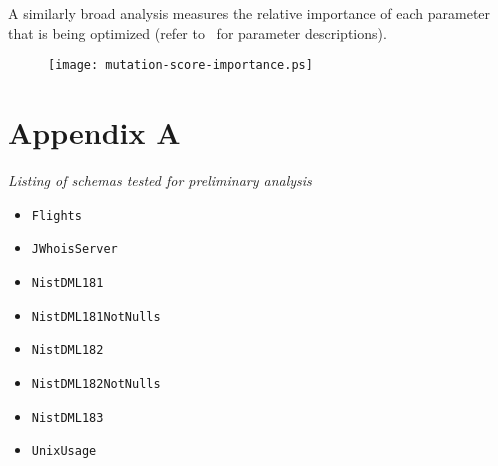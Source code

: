 \documentclass[a4paper,twocolumn]{article}
\begin{document}
A similarly broad analysis measures the relative importance of each parameter that is being optimized (refer to~ for parameter descriptions).

\begin{figure}[t]
\texttt{[image: mutation-score-importance.ps]}
\end{figure}




\pagebreak

\section*{Appendix A} \label{appA}
\textit{Listing of schemas tested for preliminary analysis}
\begin{itemize}
\item \texttt{Flights}
\item \texttt{JWhoisServer}
\item \texttt{NistDML181}
\item \texttt{NistDML181NotNulls}
\item \texttt{NistDML182}
\item \texttt{NistDML182NotNulls}
\item \texttt{NistDML183}
\item \texttt{UnixUsage}
\end{itemize}
\end{document}
